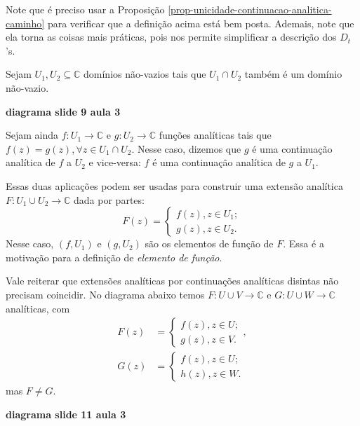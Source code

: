 Note que é preciso usar a Proposição \ref{prop-unicidade-continuacao-analitica-caminho}
para verificar que a definição acima está bem posta. Ademais, note que ela torna
as coisas mais práticas, pois nos permite simplificar a descrição dos $D_t$'s.

\begin{observacao}
Sejam $U_1, U_2\subseteq\mathbb{C}$ domínios não-vazios tais que $U_1\cap U_2$
também é um domínio não-vazio.

\begin{center}
    \textbf{diagrama slide 9 aula 3}
\end{center}

Sejam ainda $f:U_1\to\mathbb{C}$ e $g:U_2\to\mathbb{C}$ funções analíticas
tais que $f(z) = g(z), \forall z\in U_1\cap U_2$. Nesse caso, dizemos que
$g$ é uma continuação analítica de $f$ a $U_2$ e vice-versa: $f$ é 
uma continuação analítica de $g$ a $U_1$.

Essas duas aplicações podem ser usadas para construir uma extensão analítica
$F: U_1\cup U_2\to\mathbb{C}$ dada por partes:
\begin{equation*}
    F(z) = \begin{cases}
    f(z), z\in U_1; \\
    g(z), z\in U_2.
    \end{cases}
\end{equation*}
Nesse caso, $(f,U_1)$ e $(g,U_2)$ são os elementos de função de $F$. 
Essa é a motivação para a definição de \textit{elemento de função}.

Vale reiterar que extensões analíticas por continuações analíticas disintas
não precisam coincidir. No diagrama abaixo temos $F: U\cup V\to\mathbb{C}$
e $G:U\cup W\to\mathbb{C}$ analíticas, com
\begin{align*}
    F(z) &= \begin{cases}
    f(z), z\in U; \\
    g(z), z\in V.
    \end{cases}, \\
    G(z) &= \begin{cases}
    f(z), z\in U; \\
    h(z), z\in W.
    \end{cases}
\end{align*}
mas $F\neq G$.

\begin{center}
    \textbf{diagrama slide 11 aula 3}
\end{center}

\end{observacao}

